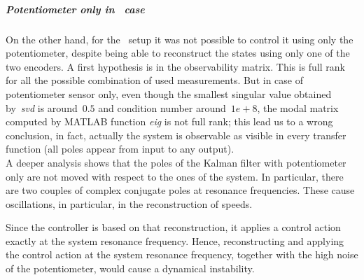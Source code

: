 \subparagraph{Potentiometer only in \twodof\ case}
On the other hand, for the \twodof\ setup it was not possible to control it using only the potentiometer, despite being able to reconstruct the states using only one of the two encoders.
A first hypothesis is in the observability matrix. This is full rank for all the possible combination of used measurements. But in case of potentiometer sensor only, even though the smallest singular value obtained by~\textit{svd} is around~$0.5$ and condition number around~$1e+8$, the modal matrix computed by MATLAB function \textit{eig} is not full rank; this lead us to a wrong conclusion, in fact, actually the system is observable as visible in every transfer function (all poles appear from input to any output). \\
A deeper analysis shows that the poles of the Kalman filter with potentiometer only are not moved with respect to the ones of the system. In particular, there are two couples of complex conjugate poles at resonance frequencies. These cause oscillations, in particular, in the reconstruction of speeds.
\label{SVD_explaination}

Since the controller is based on that reconstruction, it applies a control action exactly at the system resonance frequency. Hence, reconstructing and applying the control action at the system resonance frequency, together with the high noise of the potentiometer, would cause a dynamical instability.
